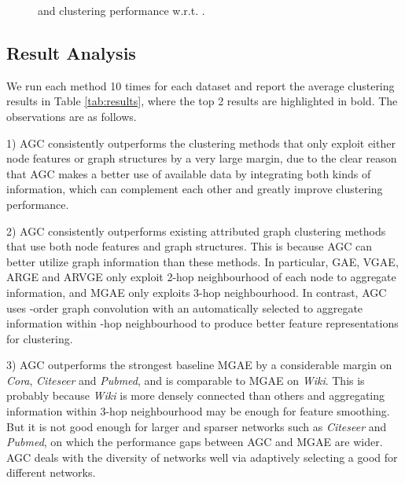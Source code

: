 \documentclass{article}
\begin{document}
\begin{figure}[t]
\centering
{}
\hfil
{}
\caption{ and clustering performance w.r.t. .}
\label{fig:k}
\end{figure}



\subsection{Result Analysis}

We run each method 10 times for each dataset and report the average clustering results in Table \ref{tab:results}, where the top 2 results are highlighted in bold. The observations are as follows.

1) AGC consistently outperforms the clustering methods that only exploit either node features or graph structures by a very large margin, due to the clear reason that AGC makes a better use of available data by integrating both kinds of information, which can complement each other and greatly improve clustering performance.


2) AGC consistently outperforms existing attributed graph clustering methods that use both node features and graph structures. This is because AGC can better utilize graph information than these methods. In particular, GAE, VGAE, ARGE and ARVGE only exploit 2-hop neighbourhood of each node to aggregate information, and MGAE only exploits 3-hop neighbourhood. In contrast, AGC uses -order graph convolution with an automatically selected  to aggregate information within -hop neighbourhood to produce better feature representations for clustering.

3) AGC outperforms the strongest baseline MGAE by a considerable margin on \emph{Cora}, \emph{Citeseer} and \emph{Pubmed}, and is comparable to MGAE on \emph{Wiki}. This is probably because \emph{Wiki} is more densely connected than others and aggregating information within 3-hop neighbourhood may be enough for feature smoothing. But it is not good enough for larger and sparser networks such as \emph{Citeseer} and \emph{Pubmed}, on which the performance gaps between AGC and MGAE are wider. AGC deals with the diversity of networks well via adaptively selecting a good  for different networks.
\end{document}
